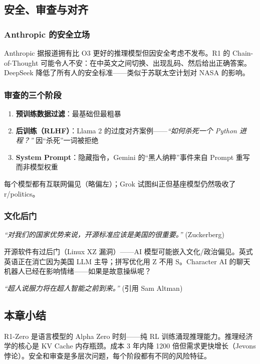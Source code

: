 \subsection{安全、审查与对齐}

\subsubsection{Anthropic 的安全立场}

Anthropic 据报道拥有比 O3 更好的推理模型但因安全考虑不发布。R1 的 Chain-of-Thought 可能令人不安：在中英文之间切换、出现乱码、然后给出正确答案。DeepSeek 降低了所有人的安全标准——类似于苏联太空计划对 NASA 的影响。

\subsubsection{审查的三个阶段}

\begin{enumerate}
    \item \textbf{预训练数据过滤}：最基础但最粗暴
    \item \textbf{后训练（RLHF）}：Llama 2 的过度对齐案例——\textit{``如何杀死一个 Python 进程？''} 因``杀死''一词被拒绝
    \item \textbf{System Prompt}：隐藏指令，Gemini 的``黑人纳粹''事件来自 Prompt 重写而非模型权重
\end{enumerate}

每个模型都有互联网偏见（略偏左）；Grok 试图纠正但基座模型仍然吸收了 r/politics。

\subsubsection{文化后门}

\textit{``对我们的国家优势来说，开源标准应该是美国的很重要。''} (Zuckerberg)

开源软件有过后门（Linux XZ 漏洞）——AI 模型可能嵌入文化/政治偏见。英式英语正在消亡因为美国 LLM 主导；拼写优化用 Z 不用 S。Character AI 的聊天机器人已经在影响情绪——如果是故意操纵呢？

\textit{``超人说服力将在超人智能之前到来。''} (引用 Sam Altman)

\subsection{本章小结}

R1-Zero 是语言模型的 Alpha Zero 时刻——纯 RL 训练涌现推理能力。推理经济学的核心是 KV Cache 内存瓶颈。成本 3 年内降 1200 倍但需求更快增长（Jevons 悖论）。安全和审查是多层次问题，每个阶段都有不同的风险特征。

